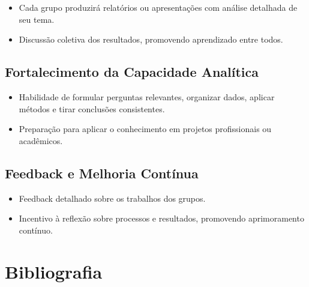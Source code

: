 \documentclass[
  letterpaper,
  DIV=11,
  numbers=noendperiod]{scrreprt}
\providecommand{\tightlist}{%
  \setlength{\itemsep}{0pt}\setlength{\parskip}{0pt}}
\begin{document}
\begin{itemize}
\tightlist
\item
  Cada grupo produzirá relatórios ou apresentações com análise detalhada
  de seu tema.\\
\item
  Discussão coletiva dos resultados, promovendo aprendizado entre todos.
\end{itemize}

\subsection{Fortalecimento da Capacidade
Analítica}\label{fortalecimento-da-capacidade-analuxedtica}

\begin{itemize}
\tightlist
\item
  Habilidade de formular perguntas relevantes, organizar dados, aplicar
  métodos e tirar conclusões consistentes.\\
\item
  Preparação para aplicar o conhecimento em projetos profissionais ou
  acadêmicos.
\end{itemize}

\subsection{Feedback e Melhoria
Contínua}\label{feedback-e-melhoria-contuxednua}

\begin{itemize}
\tightlist
\item
  Feedback detalhado sobre os trabalhos dos grupos.\\
\item
  Incentivo à reflexão sobre processos e resultados, promovendo
  aprimoramento contínuo.
\end{itemize}

\section{Bibliografia}\label{bibliografia}
\end{document}
